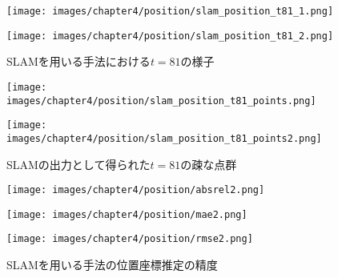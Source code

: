 \begin{figure}[h]
	\centering
	\begin{minipage}[b]{0.45\hsize}
		\centering
		\texttt{[image: images/chapter4/position/slam\_position\_t81\_1.png]}
		\label{fig:slam_position_t81_1}
	\end{minipage}
	\begin{minipage}[b]{0.45\hsize}
		\centering
		\texttt{[image: images/chapter4/position/slam\_position\_t81\_2.png]}
		\label{fig:slam_position_t81_2}
	\end{minipage}
	\caption{SLAMを用いる手法における$t=81$の様子}
	\label{fig:slam_position3}
\end{figure}

\begin{figure}
	\begin{minipage}[b]{0.5\hsize}
		\centering
		\texttt{[image: images/chapter4/position/slam\_position\_t81\_points.png]}
		\label{fig:slam_position_t81_points}
	\end{minipage}
	\begin{minipage}[b]{0.35\hsize}
		\centering
		\texttt{[image: images/chapter4/position/slam\_position\_t81\_points2.png]}
		\label{fig:slam_position_t81_points2}
	\end{minipage}
	\caption{SLAMの出力として得られた$t=81$の疎な点群}
	\label{fig:slam_position4}
\end{figure}

\begin{figure}[H]
	\centering
	\begin{minipage}[t]{0.45\linewidth}
		\centering
		\texttt{[image: images/chapter4/position/absrel2.png]}
		\label{fig:absrel12}
	\end{minipage}
	\begin{minipage}[t]{0.45\linewidth}
		\centering
		\texttt{[image: images/chapter4/position/mae2.png]}
		\label{fig:mae2}
	\end{minipage}
	\begin{minipage}[t]{0.45\linewidth}
		\centering
		\texttt{[image: images/chapter4/position/rmse2.png]}
		\label{fig:rmse2}
	\end{minipage}
	\caption{SLAMを用いる手法の位置座標推定の精度}
	\label{fig:slam_position_result}
\end{figure}


